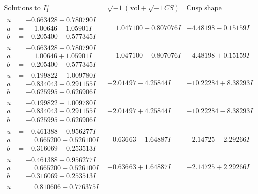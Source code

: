 \documentclass[1p]{elsarticle_modified}
\theoremstyle{definition}
\newcommand{\I}{\sqrt{-1}}
\begin{document}
$$\begin{array}{c|c|c}  
\text{Solutions to }I^u_{1}& \I (\text{vol} + \sqrt{-1}CS) & \text{Cusp shape}\\
 \hline 
\begin{aligned}
u &= -0.663428 + 0.780790 I \\
a &= \phantom{-}1.00646 - 1.05901 I \\
b &= -0.205400 + 0.577345 I\end{aligned}
 & \phantom{-}1.047100 - 0.807076 I & -4.48198 - 0.15159 I \\ \hline\begin{aligned}
u &= -0.663428 - 0.780790 I \\
a &= \phantom{-}1.00646 + 1.05901 I \\
b &= -0.205400 - 0.577345 I\end{aligned}
 & \phantom{-}1.047100 + 0.807076 I & -4.48198 + 0.15159 I \\ \hline\begin{aligned}
u &= -0.199822 + 1.009780 I \\
a &= -0.834043 - 0.291155 I \\
b &= -0.625995 - 0.626906 I\end{aligned}
 & -2.01497 - 4.25844 I & -10.22284 + 8.38293 I \\ \hline\begin{aligned}
u &= -0.199822 - 1.009780 I \\
a &= -0.834043 + 0.291155 I \\
b &= -0.625995 + 0.626906 I\end{aligned}
 & -2.01497 + 4.25844 I & -10.22284 - 8.38293 I \\ \hline\begin{aligned}
u &= -0.461388 + 0.956277 I \\
a &= \phantom{-}0.665200 + 0.526100 I \\
b &= -0.316069 + 0.253513 I\end{aligned}
 & -0.63663 - 1.64887 I & -2.14725 - 2.29266 I \\ \hline\begin{aligned}
u &= -0.461388 - 0.956277 I \\
a &= \phantom{-}0.665200 - 0.526100 I \\
b &= -0.316069 - 0.253513 I\end{aligned}
 & -0.63663 + 1.64887 I & -2.14725 + 2.29266 I \\ \hline\begin{aligned}
u &= \phantom{-}0.810606 + 0.776375 I \\

\end{aligned}
\end{array}$$
\end{document}
